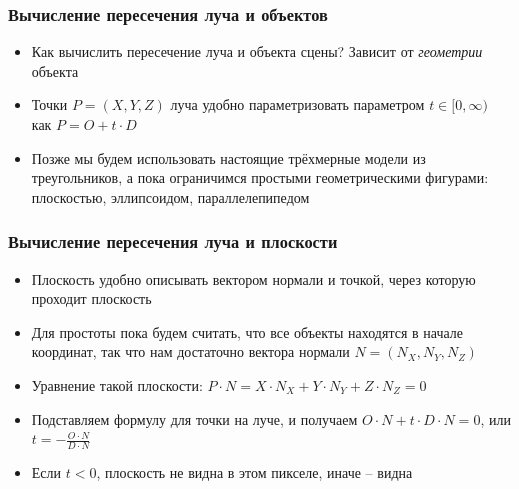 \documentclass[10pt]{beamer}
\begin{document}
\begin{frame}
\frametitle{Вычисление пересечения луча и объектов}
\begin{itemize}
\item Как вычислить пересечение луча и объекта сцены? \pause Зависит от \textit{геометрии} объекта
\pause
\item Точки \begin{math}P = (X,Y,Z)\end{math} луча удобно параметризовать параметром \begin{math}t \in [0, \infty)\end{math} как \begin{math}P = O + t \cdot D\end{math}
\pause
\item Позже мы будем использовать настоящие трёхмерные модели из треугольников, а пока ограничимся простыми геометрическими фигурами: плоскостью, эллипсоидом, параллелепипедом
\end{itemize}
\end{frame}

\begin{frame}
\frametitle{Вычисление пересечения луча и плоскости}
\begin{itemize}
\item Плоскость удобно описывать вектором нормали и точкой, через которую проходит плоскость
\pause
\item Для простоты пока будем считать, что все объекты находятся в начале координат, так что нам достаточно вектора нормали \begin{math}N = (N_X, N_Y, N_Z)\end{math}
\pause
\item Уравнение такой плоскости: \begin{math}P\cdot N = X\cdot N_X+Y\cdot N_Y+Z\cdot N_Z=0\end{math}
\pause
\item Подставляем формулу для точки на луче, и получаем \begin{math}O \cdot N + t \cdot D \cdot N = 0\end{math}, или \begin{math}t = -\frac{O \cdot N}{D \cdot N}\end{math}
\pause
\item Если \begin{math}t<0\end{math}, плоскость не видна в этом пикселе, иначе -- видна
\end{itemize}
\end{frame}
\end{document}
